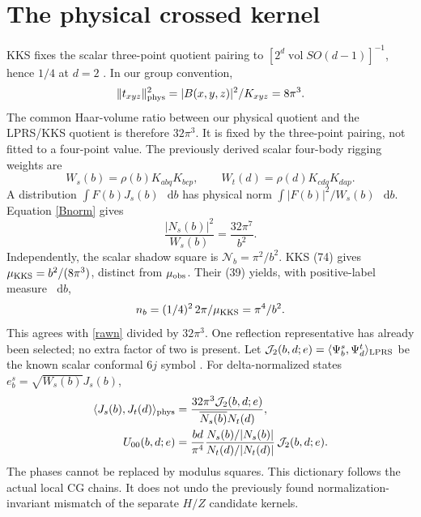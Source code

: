\documentclass[11pt,a4paper]{article}
\newcommand{\dd}{\mathop{}\!\mathrm d}
\newcommand{\cJ}{\mathcal J}
\begin{document}
\section{The physical crossed kernel}
KKS fixes the scalar three-point quotient pairing to
$[2^d\operatorname{vol}SO(d-1)]^{-1}$, hence $1/4$ at $d=2$
\cite[(13)--(15)]{kks}. In our group convention,
\[
 \|t_{xyz}\|_{\rm phys}^2=|B(x,y,z)|^2/K_{xyz}=8\pi^3 .
\]
The common Haar-volume ratio between our physical quotient and the
LPRS/KKS quotient is therefore $32\pi^3$. It is fixed by the
three-point pairing, not fitted to a four-point value.
The previously derived scalar four-body rigging weights are
\[
 W_s(b)=\rho(b)K_{abq}K_{bcp},\qquad
 W_t(d)=\rho(d)K_{cdq}K_{dap}.
\]
A distribution $\int F(b)J_s(b)\,\dd b$ has physical norm
$\int |F(b)|^2/W_s(b)\,\dd b$. Equation \eqref{Bnorm} gives
\begin{equation}
 \frac{|N_s(b)|^2}{W_s(b)}=\frac{32\pi^7}{b^2}.
 \label{rawn}
\end{equation}
Independently, the scalar shadow square is $\mathcal N_b=\pi^2/b^2$.
KKS (74) gives $\mu_{\rm KKS}=b^2/(8\pi^3)$, distinct from
$\mu_{\rm obs}$. Their (39) yields, with positive-label measure $\dd b$,
\[
 n_b=(1/4)^2\,2\pi/\mu_{\rm KKS}=\pi^4/b^2.
\]
This agrees with \eqref{rawn} divided by $32\pi^3$.
One reflection representative has already been selected; no extra
factor of two is present.
Let $\cJ_2(b,d;e)=\langle\Psi_b^s,\Psi_d^t\rangle_{\rm LPRS}$
be the known scalar conformal $6j$ symbol \cite[(3.4)--(3.5)]{lprs}.
For delta-normalized states $e_b^s=\sqrt{W_s(b)}J_s(b)$,
\begin{align}
 \langle J_s(b),J_t(d)\rangle_{\rm phys}
 &=\frac{32\pi^3\cJ_2(b,d;e)}{\overline{N_s(b)}N_t(d)},\\
 U_{00}(b,d;e)&=\frac{bd}{\pi^4}
   \frac{N_s(b)/|N_s(b)|}{N_t(d)/|N_t(d)|}\,\cJ_2(b,d;e).
 \label{U}
\end{align}
The phases cannot be replaced by modulus squares.
This dictionary follows the actual local CG chains. It does not undo
the previously found normalization-invariant mismatch of the separate
$H/Z$ candidate kernels.
\end{document}

